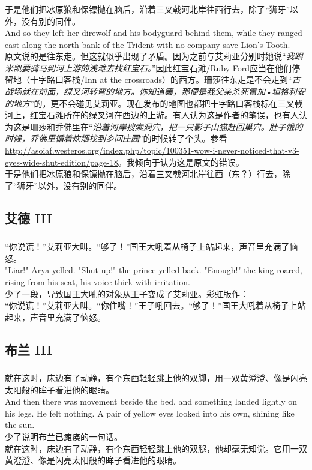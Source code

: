\documentclass[12pt,a4paper]{article}
\newcommand{\h}[1]{{\color{red}#1}\\}
\newcommand{\la}[1]{{\color{blue}#1}\\}
\begin{document}
\subsubsection{}\la{	
	于是他们把冰原狼和保镖抛在脑后，沿着三叉戟河北岸往西行去，除了“狮牙”以外，没有别的同伴。\\
	And so they left her direwolf and his bodyguard behind them, while they ranged east along the north bank of the Trident with no company save Lion's Tooth.}\h{
	原文说的是往东走。但这就似乎出现了矛盾。因为之前与艾莉亚分别时她说“\emph{我跟米凯要骑马到河上游的浅滩去找红宝石。}”因此红宝石滩/Ruby Ford应当在他们停留地（十字路口客栈/Inn at the crossroads）的西方。珊莎往东走是不会走到“\emph{古战场就在前面，绿叉河转弯的地方。你知道罢，那便是我父亲杀死雷加•坦格利安的地方}”的，更不会碰见艾莉亚。现在发布的地图也都把十字路口客栈标在三叉戟河上，红宝石滩所在的绿叉河在西边的上游。有人认为这是作者的笔误，也有人认为这是珊莎和乔佛里在“\emph{沿着河岸搜索洞穴，把一只影子山猫赶回巢穴。肚子饿的时候，乔佛里循着炊烟找到乡间庄园}”的时候转了个头。参看\url{http://asoiaf.westeros.org/index.php/topic/100351-wow-i-never-noticed-that-v3-eyes-wide-shut-edition/page-18}。我倾向于认为这是原文的错误。}
	于是他们把冰原狼和保镖抛在脑后，沿着三叉戟河北岸往西（东？）行去，除了“狮牙”以外，没有别的同伴。
	
\subsection{艾德 III}	
\subsubsection{}\la{
	“你说谎！”艾莉亚大叫。“够了！”国王大吼着从椅子上站起来，声音里充满了恼怒。\\
	"Liar!" Arya yelled. "Shut up!" the prince yelled back. "Enough!" the king roared, rising from his seat, his voice thick with irritation.}\h{
	少了一段，导致国王大吼的对象从王子变成了艾莉亚。彩虹版作：}
	“你说谎！”艾莉亚大叫。“你住嘴！”王子吼回去。“够了！”国王大吼着从椅子上站起来，声音里充满了恼怒。
	
	\subsection{布兰 III}		
	\subsubsection{}\la{
		就在这时，床边有了动静，有个东西轻轻跳上他的双脚，用一双黄澄澄、像是闪亮太阳般的眸子看进他的眼睛。\\
		And then there was movement beside the bed, and something landed lightly on his legs. He felt nothing. A pair of yellow eyes looked into his own, shining like the sun.}\h{
		少了说明布兰已瘫痪的一句话。}
	就在这时，床边有了动静，有个东西轻轻跳上他的双腿，他却毫无知觉。它用一双黄澄澄、像是闪亮太阳般的眸子看进他的眼睛。
	
\end{document}
